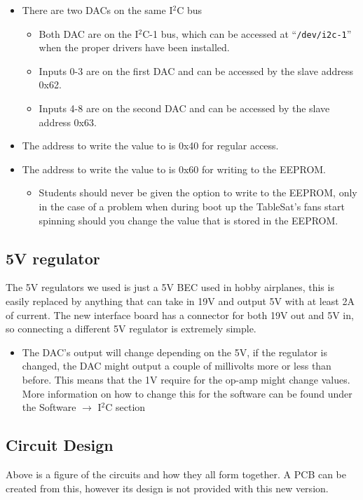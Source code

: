 \documentclass{article}
\begin{document}
\begin{itemize}
    \item There are two DACs on the same I$^2$C bus
    \begin{itemize}
        \item Both DAC are on the I$^2$C-1 bus, which can be accessed at ``{\tt /dev/i2c-1}'' when the proper drivers have been installed.
        \item Inputs 0-3 are on the first DAC and can be accessed by the slave address 0x62.
        \item Inputs 4-8 are on the second DAC and can be accessed by the slave address 0x63.
    \end{itemize}
    \item The address to write the value to is 0x40 for regular access.
    \item The address to write the value to is 0x60 for writing to the EEPROM.
    \begin{itemize}
        \item Students should never be given the option to write to the EEPROM, only in the case of a problem when during boot up the TableSat's fans start spinning should you change the value that is stored in the EEPROM.
    \end{itemize}
\end{itemize}
\subsection{5V regulator}
The 5V regulators we used is just a 5V BEC used in hobby airplanes, this is easily replaced by anything that can take in 19V and output 5V with at least 2A of current. The new interface board has a connector for both 19V out and 5V in, so connecting a different 5V regulator is extremely simple.

\begin{itemize}
    \item The DAC's output will change depending on the 5V, if the regulator is changed, the DAC might output a couple of millivolts more or less than before. This means that the 1V require for the op-amp might change values. More information on how to change this for the software can be found under the Software $\rightarrow$ I$^2$C section
\end{itemize}
\subsection{Circuit Design}
Above is a figure of the circuits and how they all form together. A PCB can be created from this, however its design is not provided with this new version.
\end{document}

